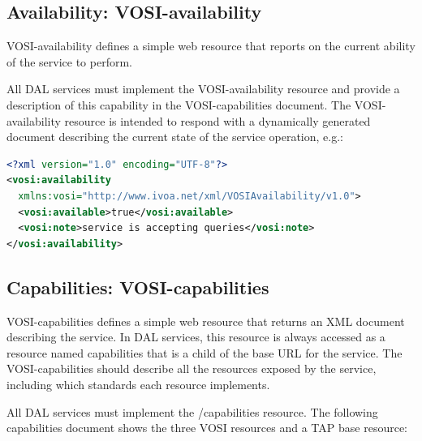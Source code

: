 \documentclass[11pt,letter]{ivoa}
\begin{document}
\subsection{Availability: VOSI-availability}
\label{sec:vosi-availability}
VOSI-availability \citep{2017ivoa.spec.0524G} defines a simple web resource that 
reports on the current ability of the service to perform. 

All DAL services must implement the VOSI-availability resource and provide a description
of this capability in the VOSI-capabilities document. The VOSI-availability resource is
intended to respond with a dynamically generated document describing the current state of the service 
operation, e.g.:

\begin{lstlisting}[language=XML,basicstyle=\footnotesize]
<?xml version="1.0" encoding="UTF-8"?>
<vosi:availability  
  xmlns:vosi="http://www.ivoa.net/xml/VOSIAvailability/v1.0">
  <vosi:available>true</vosi:available>
  <vosi:note>service is accepting queries</vosi:note>
</vosi:availability>
\end{lstlisting}

\subsection{Capabilities: VOSI-capabilities}
\label{sec:vosi-capabilities}
VOSI-capabilities \citep{2017ivoa.spec.0524G} defines a simple web resource that 
returns an XML document 
describing the service. In  DAL services, this resource is always accessed as a 
resource named capabilities that is a child of the base URL for the service. The 
VOSI-capabilities should describe all the resources exposed by the service, 
including which standards each resource implements.

All DAL services must implement the /capabilities resource. The following 
capabilities document shows the three VOSI resources and a TAP base resource: 
\end{document}
